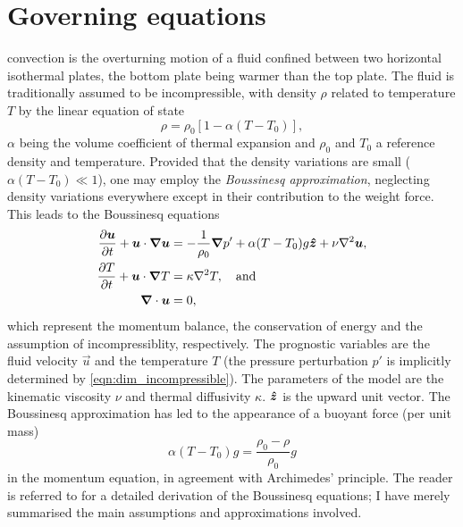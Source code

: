 \documentclass[../main.tex]{subfiles}
\begin{document}

\section{Governing equations}
\rb{} convection is the overturning motion of a fluid confined between two
horizontal isothermal plates, the bottom plate being warmer than the top plate.
The fluid is traditionally assumed to be incompressible, with density $\rho$
related to temperature $T$ by the linear equation of state
\[
    \rho = \rho_0 [1 - \alpha(T - T_0)],
\]
$\alpha$ being the volume coefficient of thermal expansion and $\rho_0$ and
$T_0$ a reference density and temperature. Provided that the density variations
are small ($\alpha (T - T_0) \ll 1$), one may employ the \emph{Boussinesq
approximation}, neglecting density variations everywhere except in their
contribution to the weight force. This leads to the Boussinesq equations
\begin{align}
    \label{eqn:dim_momentum}
    \frac{\partial \bm{u}}{\partial t} + \bm{u} \cdot \bm{\nabla} \bm{u}
        &= -\frac{1}{\rho_0} \bm{\nabla} p' + \alpha (T - T_0) g \bm{\hat{z}}
            + \nu \nabla^2 \bm{u}, \\
    \label{eqn:dim_energy}
    \frac{\partial T}{\partial t} + \bm{u} \cdot \bm{\nabla} T &= \kappa \nabla^2 T,
        \quad \text{and} \\
    \label{eqn:dim_incompressible}
    \bm{\nabla} \cdot \bm{u} &= 0,
\end{align}
which represent the momentum balance, the conservation of energy and the
assumption of incompressiblity, respectively. The prognostic variables are the
fluid velocity $\vec{u}$ and the temperature $T$ (the pressure perturbation
$p'$ is implicitly determined by \cref{eqn:dim_incompressible}). The parameters
of the model are the kinematic viscosity $\nu$ and thermal diffusivity
$\kappa$. $\bm{\hat{z}}$ is the upward unit vector. The Boussinesq approximation
has led to the appearance of a buoyant force (per unit mass)
\[
    \alpha (T - T_0) g = \frac{\rho_0 - \rho}{\rho_0} g
\]
in the momentum equation, in agreement with Archimedes' principle. The reader
is referred to \textcite{chandrasekhar1961} for a detailed derivation of the
Boussinesq equations; I have merely summarised the main assumptions and
approximations involved.
\end{document}
